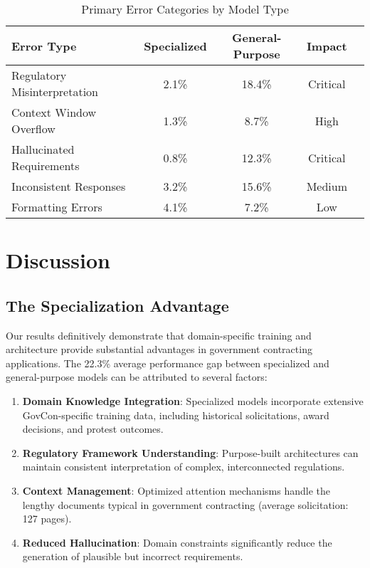 \documentclass[11pt,a4paper]{article}
\begin{document}
\begin{table}[H]
\centering
\caption{Primary Error Categories by Model Type}
\label{tab:errors}
\begin{tabular}{@{}lcccc@{}}
\toprule
\textbf{Error Type} & \textbf{Specialized} & \textbf{General-Purpose} & \textbf{Impact} \\
\midrule
Regulatory Misinterpretation & 2.1\% & 18.4\% & Critical \\
Context Window Overflow & 1.3\% & 8.7\% & High \\
Hallucinated Requirements & 0.8\% & 12.3\% & Critical \\
Inconsistent Responses & 3.2\% & 15.6\% & Medium \\
Formatting Errors & 4.1\% & 7.2\% & Low \\
\bottomrule
\end{tabular}
\end{table}

\section{Discussion}

\subsection{The Specialization Advantage}

Our results definitively demonstrate that domain-specific training and architecture provide substantial advantages in government contracting applications. The 22.3\% average performance gap between specialized and general-purpose models can be attributed to several factors:

\begin{enumerate}
    \item \textbf{Domain Knowledge Integration}: Specialized models incorporate extensive GovCon-specific training data, including historical solicitations, award decisions, and protest outcomes.
    
    \item \textbf{Regulatory Framework Understanding}: Purpose-built architectures can maintain consistent interpretation of complex, interconnected regulations.
    
    \item \textbf{Context Management}: Optimized attention mechanisms handle the lengthy documents typical in government contracting (average solicitation: 127 pages).
    
    \item \textbf{Reduced Hallucination}: Domain constraints significantly reduce the generation of plausible but incorrect requirements.
\end{enumerate}
\end{document}
